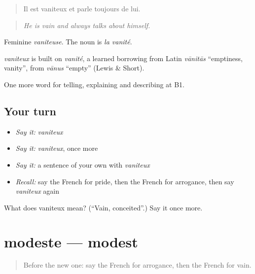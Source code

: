 \begin{quote}
Il est vaniteux et parle toujours de lui.
\end{quote}

\begin{quote}
\emph{He is vain and always talks about himself.}
\end{quote}

Feminine \emph{vaniteuse}. The noun is \emph{la vanité}.

\begin{cousinweb}
\emph{vaniteux} is built on \emph{vanité}, a learned borrowing from Latin \emph{vānitās} \textquotedblleft{}emptiness, vanity\textquotedblright{}, from \emph{vānus} \textquotedblleft{}empty\textquotedblright{} (Lewis \& Short).
\end{cousinweb}

\begin{grammarlens}[title={What you've built}]
One more word for telling, explaining and describing at B1.
\end{grammarlens}

\subsection*{Your turn}
\begin{itemize}
\raggedright
  \item \emph{Say it:} \emph{vaniteux}
  \item \emph{Say it:} \emph{vaniteux}, once more
  \item \emph{Say it:} a sentence of your own with \emph{vaniteux}
  \item \emph{Recall:} say the French for pride, then the French for arrogance, then say \emph{vaniteux} again
\end{itemize}

\begin{tcolorbox}[breakable,colback=teal!4,colframe=teal!35!black,title={Before you move on}]
What does vaniteux mean? (\textquotedblleft{}Vain, conceited\textquotedblright{}.) Say it once more.
\end{tcolorbox}
\section[modeste]{modeste — modest}

\label{lesson:FR-C473-modeste}



\begin{quote}
Before the new one: say the French for arrogance, then the French for vain.
\end{quote}

